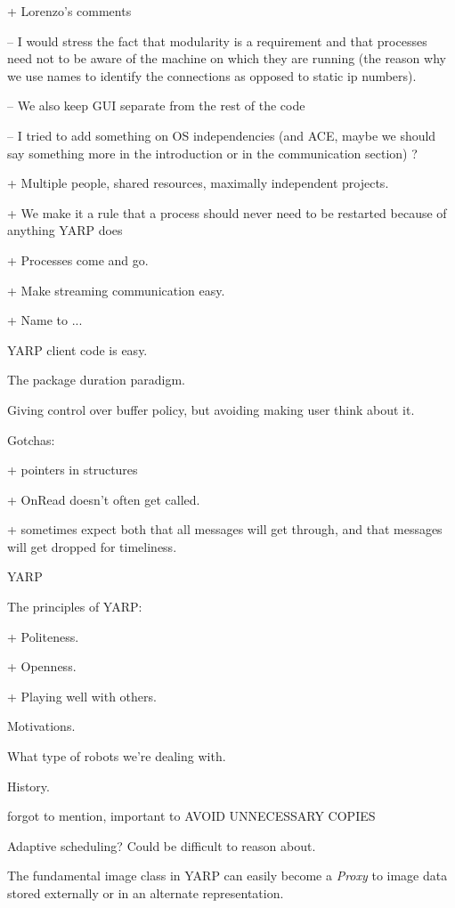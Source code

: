 
+ Lorenzo's comments

-- I would stress the fact that modularity is a requirement and that processes need not to be aware of the machine on which they are running (the reason why we use names to identify the connections as opposed to static ip numbers).

-- We also keep GUI separate from the rest of the code

-- I tried to add something on OS independencies (and ACE, maybe we should say something more in the introduction or in the communication section) ?

+ Multiple people, shared resources, maximally independent projects.

+ We make it a rule that a process should never need to be restarted
  because of anything YARP does

+ Processes come and go.

+ Make streaming communication easy.

+ Name to ...




YARP client code is easy.

The package duration paradigm.

Giving control over buffer policy, but avoiding making user
think about it.

Gotchas:

+ pointers in structures

+ OnRead doesn't often get called.

+ sometimes expect both that all messages will get through, and
  that messages will get dropped for timeliness.

YARP

The principles of YARP:

+ Politeness.

+ Openness.

+ Playing well with others.

Motivations.

What type of robots we're dealing with.

History.

forgot to mention, important to AVOID UNNECESSARY COPIES


Adaptive scheduling?  Could be difficult to reason about.


The fundamental image class in YARP can easily become a {\em Proxy}
to image data stored externally or in an alternate representation.



